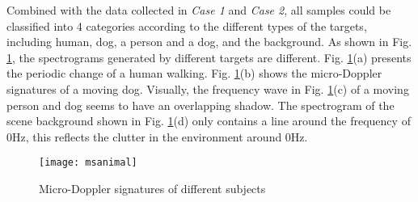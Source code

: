 Combined with the data collected in \textit{Case 1} and \textit{Case 2}, all samples could be classified into 4 categories according to the different types of the targets, including human, dog, a person and a dog, and the background. As shown in Fig. \ref{fig_msani}, the spectrograms generated by different targets are different. Fig. \ref{fig_msani}(a) presents the periodic change of a human walking. Fig. \ref{fig_msani}(b) shows the micro-Doppler signatures of a moving dog. Visually, the frequency wave in Fig. \ref{fig_msani}(c) of a moving person and dog seems to have an overlapping shadow. The spectrogram of the scene background shown in Fig. \ref{fig_msani}(d) only contains a line around the frequency of 0Hz, this reflects the clutter in the environment around 0Hz. 
\begin{figure}[!t]
\centering
\texttt{[image: msanimal]}
\caption{Micro-Doppler signatures of different subjects}
\label{fig_msani}
\end{figure}